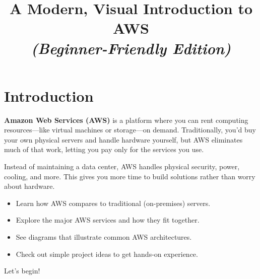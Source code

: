 \documentclass[12pt]{article}
\title{%
  \vspace{-2cm}
  \textbf{\color{mainDark}\Huge A Modern, Visual Introduction to AWS}\\
  \vspace{0.2cm}
  \large \textit{(Beginner-Friendly Edition)}
}
\author{}
\date{}
\begin{document}
\maketitle
\vspace{-1cm}

\section*{Introduction}
\justifying

\textbf{Amazon Web Services (AWS)} is a platform where you can rent computing resources---like virtual machines or storage---on demand. Traditionally, you'd buy your own physical servers and handle hardware yourself, but AWS eliminates much of that work, letting you pay only for the services you use.

\begin{center}
\end{center}

Instead of maintaining a data center, AWS handles physical security, power, cooling, and more. This gives you more time to build solutions rather than worry about hardware.

\begin{itemize}
    \item Learn how AWS compares to traditional (on-premises) servers.
    \item Explore the major AWS services and how they fit together.
    \item See diagrams that illustrate common AWS architectures.
    \item Check out simple project ideas to get hands-on experience.
\end{itemize}

Let's begin!

\clearpage

\end{document}
